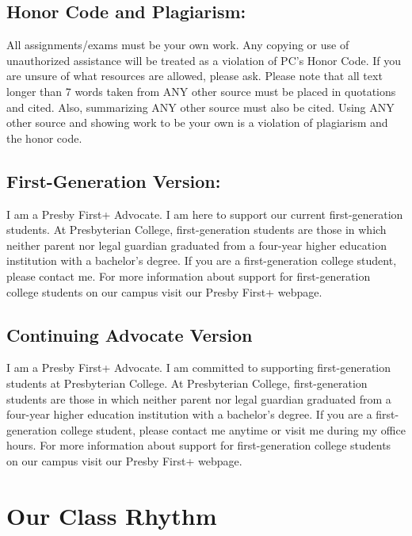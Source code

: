 \documentclass[
]{book}
\begin{document}
\hypertarget{honor-code-and-plagiarism}{%
\section{Honor Code and Plagiarism:}\label{honor-code-and-plagiarism}}

All assignments/exams must be your own work. Any copying or use of unauthorized assistance will be treated as a violation of PC's Honor Code. If you are unsure of what resources are allowed, please ask. Please note that all text longer than 7 words taken from ANY other source must be placed in quotations and cited. Also, summarizing ANY other source must also be cited. Using ANY other source and showing work to be your own is a violation of plagiarism and the honor code.

\hypertarget{first-generation-version}{%
\section{First-Generation Version:}\label{first-generation-version}}

I am a Presby First+ Advocate. I am here to support our current first-generation students. At Presbyterian College, first-generation students are those in which neither parent nor legal guardian graduated from a four-year higher education institution with a bachelor's degree. If you are a first-generation college student, please contact me. For more information about support for first-generation college students on our campus visit our Presby First+ webpage.

\hypertarget{continuing-advocate-version}{%
\section{Continuing Advocate Version}\label{continuing-advocate-version}}

I am a Presby First+ Advocate. I am committed to supporting first-generation students at Presbyterian College. At Presbyterian College, first-generation students are those in which neither parent nor legal guardian graduated from a four-year higher education institution with a bachelor's degree. If you are a first-generation college student, please contact me anytime or visit me during my office hours. For more information about support for first-generation college students on our campus visit our Presby First+ webpage.

\hypertarget{our-class-rhythm}{%
\chapter{Our Class Rhythm}\label{our-class-rhythm}}
\end{document}
